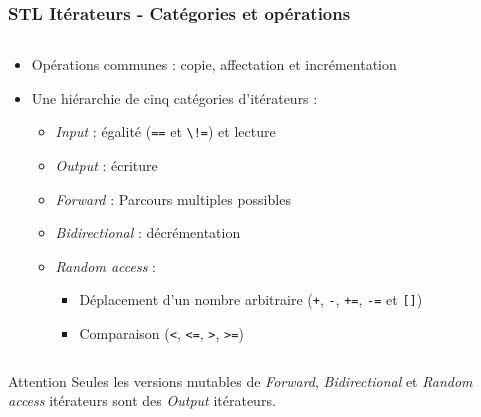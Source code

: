 \documentclass[C++.tex]{subfiles}
\begin{document}
\begin{frame}
	\frametitle{STL Itérateurs - Catégories et opérations}
	\begin{columns}[T]
		\begin{column}{0.80\textwidth}
			\begin{itemize}
				\item Opérations communes : copie, affectation et incrémentation
				\item Une hiérarchie de cinq catégories d'itérateurs :
				\begin{itemize}
					\item \textit{Input} : égalité (\lstinline|==| et \lstinline|\!=|) et lecture
					\item \textit{Output} : écriture
					\item \textit{Forward} : Parcours multiples possibles


					\item \textit{Bidirectional} : décrémentation
					\item \textit{Random access} : 
					\begin{itemize}
						\item Déplacement d'un nombre arbitraire (\lstinline|+|, \lstinline|-|, \lstinline|+=|, \lstinline|-=| et \lstinline|[]|)
						\item Comparaison (\lstinline|<|, \lstinline|<=|, \lstinline|>|, \lstinline|>=|)
					\end{itemize} 
				\end{itemize}
			\end{itemize}
		\end{column}

		\begin{column}{0.20\textwidth}
			\centering
		\end{column}
	\end{columns}

	\begin{alertblock}{Attention}
		Seules les versions mutables de \textit{Forward}, \textit{Bidirectional} et \textit{Random access} itérateurs sont des \textit{Output} itérateurs.
	\end{alertblock}
\end{frame}
\end{document}
